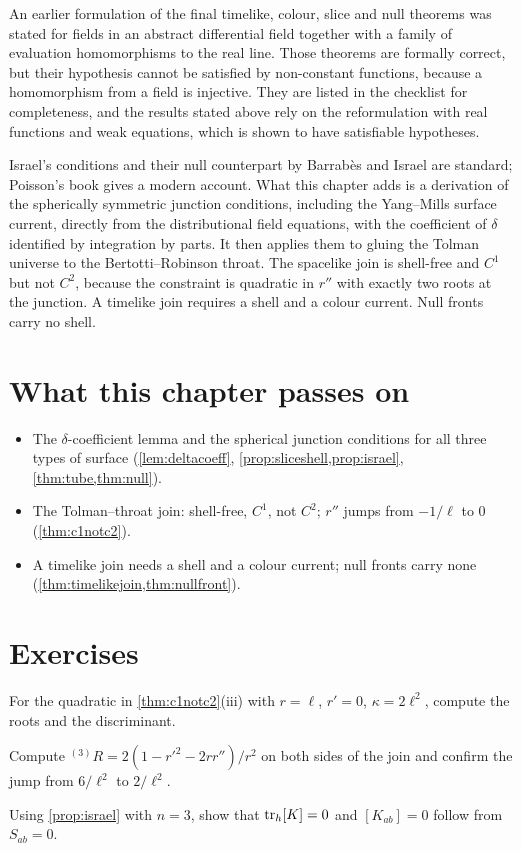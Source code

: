 An earlier formulation of the final timelike, colour, slice and null theorems was stated for fields in an abstract differential field together with a family of evaluation homomorphisms to the real line. Those theorems are formally correct, but their hypothesis cannot be satisfied by non-constant functions, because a homomorphism from a field is injective. They are listed in the checklist for completeness, and the results stated above rely on the reformulation with real functions and weak equations, which is shown to have satisfiable hypotheses.

\begin{litbox}
Israel's conditions \cite{Israel1966} and their null counterpart by Barrab\`es and Israel \cite{BarrabesIsrael1991} are standard; Poisson's book \cite{PoissonToolkit} gives a modern account. What this chapter adds is a derivation of the spherically symmetric junction conditions, including the Yang--Mills surface current, directly from the distributional field equations, with the coefficient of $\delta$ identified by integration by parts. It then applies them to gluing the Tolman universe to the Bertotti--Robinson throat. The spacelike join is shell-free and $C^1$ but not $C^2$, because the constraint is quadratic in $r''$ with exactly two roots at the junction. A timelike join requires a shell and a colour current. Null fronts carry no shell.
\end{litbox}

\section*{What this chapter passes on}
\begin{itemize}[nosep]
\item The $\delta$-coefficient lemma and the spherical junction conditions for all three types of surface (\cref{lem:deltacoeff}, \cref{prop:sliceshell,prop:israel}, \cref{thm:tube,thm:null}).
\item The Tolman--throat join: shell-free, $C^1$, not $C^2$; $r''$ jumps from $-1/\ell$ to $0$ (\cref{thm:c1notc2}).
\item A timelike join needs a shell and a colour current; null fronts carry none (\cref{thm:timelikejoin,thm:nullfront}).
\end{itemize}

\section*{Exercises}
\begin{exercise}
For the quadratic in \cref{thm:c1notc2}(iii) with $r=\ell$, $r'=0$, $\kappa=2\ell^2$, compute the roots and the discriminant.
\end{exercise}
\begin{exercise}
Compute ${}^{(3)}R=2(1-r'^2-2rr'')/r^2$ on both sides of the join and confirm the jump from $6/\ell^2$ to $2/\ell^2$.
\end{exercise}
\begin{exercise}
Using \cref{prop:israel} with $n=3$, show that $\operatorname{tr}_h[K]=0$ and $[K_{ab}]=0$ follow from $S_{ab}=0$.
\end{exercise}

